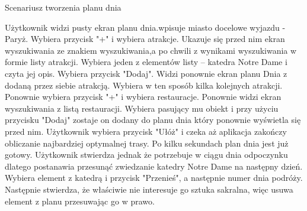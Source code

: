 \documentclass[10pt,twoside,a4paper]{report}
\begin{document}
\begin{center}
\par {Scenariusz tworzenia planu dnia} 
\end{center}

\par
Użytkownik widzi pusty ekran planu dnia.wpisuje miasto docelowe wyjazdu - Paryż. Wybiera przycisk "+" i wybiera atrakcje. Ukazuje się przed nim ekran wyszukiwania ze znakiem wyszukiwania,a po chwili z wynikami wyszukiwania w formie listy atrakcji. Wybiera jeden z elementów listy – katedra Notre Dame i czyta jej opis. Wybiera przycisk "Dodaj". Widzi ponownie ekran planu Dnia z dodaną przez siebie atrakcją. Wybiera w ten sposób kilka kolejnych atrakcji. Ponownie wybiera przycisk "+" i wybiera restauracje. Ponownie widzi ekran wyszukiwania z listą restauracji. Wybiera pasujący mu obiekt i przy użyciu przycisku "Dodaj" zostaje on dodany do  planu dnia który ponownie wyświetla się przed nim. Użytkownik wybiera przycisk "Ułóż" i czeka aż aplikacja zakończy obliczanie najbardziej optymalnej trasy. Po kilku sekundach plan dnia jest już gotowy. Użytkownik stwierdza jednak że potrzebuje w ciągu dnia odpoczynku dlatego postanawia przesunąć zwiedzanie katedry Notre Dame na następny dzień. Wybiera element z katedrą i przycisk "Przenieś", a następnie numer dnia podróży. Następnie stwierdza, że właściwie nie interesuje go sztuka sakralna, więc usuwa element z planu przesuwając go w prawo.
\end{document}
